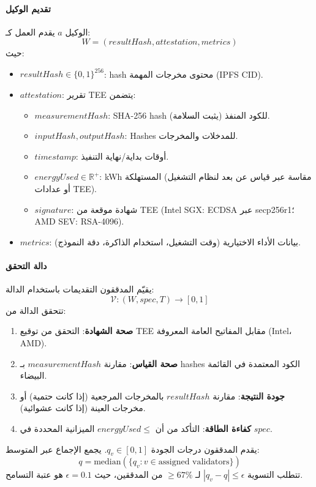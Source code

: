 \documentclass[11pt]{article}
\begin{document}
\paragraph{تقديم الوكيل} الوكيل $a$ يقدم العمل كـ:
\begin{equation}
W = (resultHash, attestation, metrics)
\end{equation}
حيث:
\begin{itemize}[noitemsep]
  \item $resultHash \in \{0,1\}^{256}$: hash محتوى مخرجات المهمة (IPFS CID).
  \item $attestation$: تقرير TEE يتضمن:
    \begin{itemize}[noitemsep]
      \item $measurementHash$: SHA-256 hash للكود المنفذ (يثبت السلامة).
      \item $inputHash, outputHash$: Hashes للمدخلات والمخرجات.
      \item $timestamp$: أوقات بداية/نهاية التنفيذ.
      \item $energyUsed \in \mathbb{R}^+$: kWh المستهلكة (مقاسة عبر قياس عن بعد لنظام التشغيل أو عدادات TEE).
      \item $signature$: شهادة موقعة من TEE (Intel SGX: ECDSA عبر secp256r1؛ AMD SEV: RSA-4096).
    \end{itemize}
  \item $metrics$: بيانات الأداء الاختيارية (وقت التشغيل، استخدام الذاكرة، دقة النموذج).
\end{itemize}

\paragraph{دالة التحقق} يقيّم المدققون التقديمات باستخدام الدالة:
\begin{equation}
\mathcal{V}: (W, spec, T) \rightarrow [0, 1]
\end{equation}
تتحقق الدالة من:
\begin{enumerate}[noitemsep]
  \item \textbf{صحة الشهادة}: التحقق من توقيع TEE مقابل المفاتيح العامة المعروفة (Intel، AMD).
  \item \textbf{صحة القياس}: مقارنة $measurementHash$ بـ hashes الكود المعتمدة في القائمة البيضاء.
  \item \textbf{جودة النتيجة}: مقارنة $resultHash$ بالمخرجات المرجعية (إذا كانت حتمية) أو مخرجات العينة (إذا كانت عشوائية).
  \item \textbf{كفاءة الطاقة}: التأكد من أن $energyUsed \leq$ الميزانية المحددة في $spec$.
\end{enumerate}
يقدم المدققون درجات الجودة $q_v \in [0,1]$. يجمع الإجماع عبر المتوسط:
\begin{equation}
q = \text{median}(\{q_v : v \in \text{assigned validators}\})
\end{equation}
تتطلب التسوية $|q_v - q| \leq \epsilon$ لـ $\geq 67\%$ من المدققين، حيث $\epsilon = 0.1$ هو عتبة التسامح.
\end{document}
